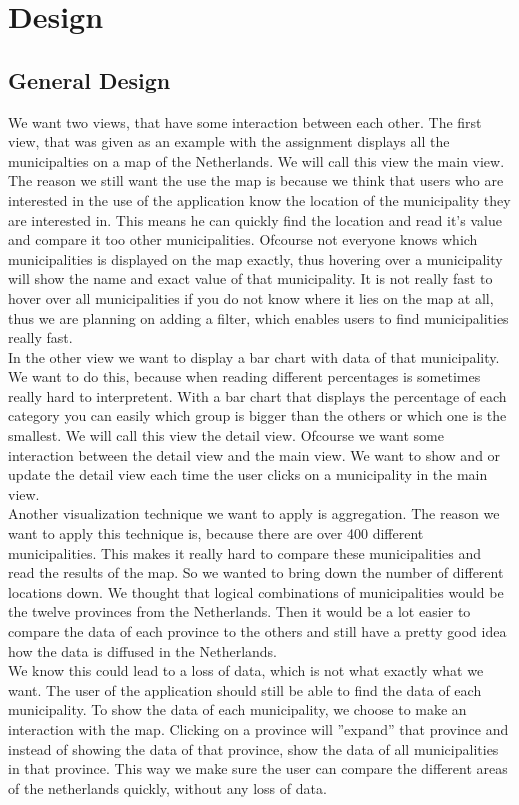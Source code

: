 \section{Design}\label{Sec:Des}
\subsection{General Design}
We want two views, that have some interaction between each other. The first view, that was given as an example with the assignment displays all the municipalties on a map of the Netherlands. We will call this view the main view. The reason we still want the use the map is because we think that users who are interested in the use of the application know the location of the municipality they are interested in. This means he can quickly find the location and read it's value and compare it too other municipalities. Ofcourse not everyone knows which municipalities is displayed on the map exactly, thus hovering over a municipality will show the name and exact value of that municipality. It is not really fast to hover over all municipalities if you do not know where it lies on the map at all, thus we are planning on adding a filter, which enables users to find municipalities really fast. \\
In the other view we want to display a bar chart with data of that municipality.  We want to do this, because when reading different percentages is sometimes really hard to interpretent. With a bar chart that displays the percentage of each category you can easily which group is bigger than the others or which one is the smallest. We will call this view the detail view. Ofcourse we want some interaction between the detail view and the main view. We want to show and or update the detail view each time the user clicks on a municipality in the main view. \\
Another visualization technique we want to apply is aggregation. The reason we want to apply this technique is, because there are over 400 different municipalities. This makes it really hard to compare these municipalities and read the results of the map. So we wanted to bring down the number of different locations down. We thought that logical combinations of municipalities would be the twelve provinces from the Netherlands. Then it would be a lot easier to compare the data of each province to the others and still have a pretty good idea how the data is diffused in the Netherlands. \\
We know this could lead to a loss of data, which is not what exactly what we want. The user of the application should still be able to find the data of each municipality. To show the data of each municipality, we choose to make an interaction with the map. Clicking on a province will ''expand'' that province and instead of showing the data of that province, show the data of all municipalities in that province. This way we make sure the user can compare the different areas of the netherlands quickly, without any loss of data. \\
